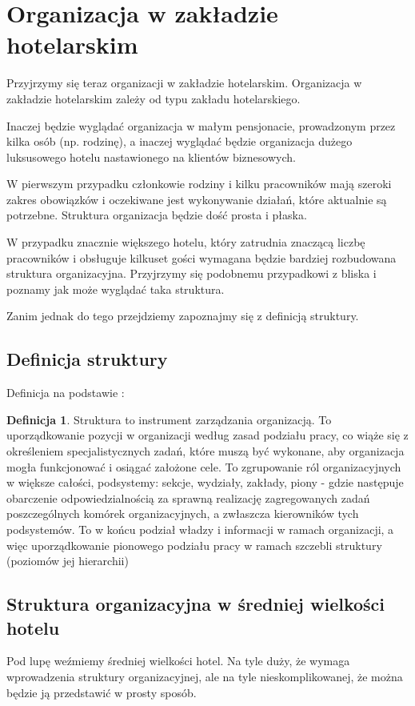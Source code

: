 \documentclass[a4paper,onecolumn,oneside,11pt,wide,floatssmall]{mwrep}
\theoremstyle{definition}
\newtheorem{defn}{Definicja}[section]
\theoremstyle{plain}%
\theoremstyle{remark}
\begin{document}
\section{Organizacja w zakładzie hotelarskim}
Przyjrzymy się teraz organizacji w zakładzie hotelarskim. Organizacja w 
zakładzie hotelarskim zależy od typu zakładu hotelarskiego. 

Inaczej będzie wyglądać organizacja w małym pensjonacie, prowadzonym przez 
kilka osób (np. rodzinę), a inaczej wyglądać będzie organizacja dużego 
luksusowego hotelu nastawionego na klientów biznesowych. 

W pierwszym przypadku członkowie rodziny i kilku pracowników mają szeroki 
zakres obowiązków i oczekiwane jest wykonywanie działań, które aktualnie są 
potrzebne. Struktura organizacja będzie dość prosta i płaska.

W przypadku znacznie większego hotelu, który zatrudnia znaczącą liczbę 
pracowników i obsługuje kilkuset gości wymagana będzie bardziej rozbudowana 
struktura organizacyjna. Przyjrzymy się podobnemu przypadkowi z bliska i 
poznamy jak może wyglądać taka struktura. 

Zanim jednak do tego przejdziemy zapoznajmy się z definicją struktury.

\subsection{Definicja struktury}
Definicja na podstawie \cite{bk:def-struktury}:
\begin{defn}{Struktura} 
to instrument zarządzania organizacją. To uporządkowanie pozycji w 
organizacji według zasad podziału pracy, co wiąże się z określeniem 
specjalistycznych zadań, które muszą być wykonane, aby organizacja mogła 
funkcjonować i osiągać założone cele. To zgrupowanie ról organizacyjnych w 
większe całości, podsystemy: sekcje, wydziały, zakłady, piony - gdzie 
następuje obarczenie odpowiedzialnością za sprawną realizację zagregowanych 
zadań poszczególnych komórek organizacyjnych, a zwłaszcza kierowników tych 
podsystemów. To w końcu podział władzy i informacji w ramach organizacji, a 
więc uporządkowanie pionowego podziału pracy w ramach szczebli struktury 
(poziomów jej hierarchii)
\end{defn}

\subsection{Struktura organizacyjna w średniej wielkości hotelu}
Pod lupę weźmiemy średniej wielkości hotel. Na tyle duży, że wymaga 
wprowadzenia struktury organizacyjnej, ale na tyle nieskomplikowanej, że można 
będzie ją przedstawić w prosty sposób.
\end{document}
